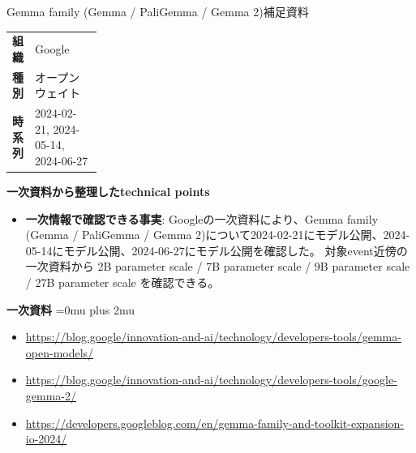 \Needspace{0.38\textheight}
\begin{technicalnote}{Gemma family (Gemma / PaliGemma / Gemma 2)}{補足資料}
\begingroup
\begin{tabularx}{\linewidth}{@{}>{\bfseries}p{0.22\linewidth}X@{}}
組織 & Google \\
種別 & オープンウェイト \\
時系列 & 2024-02-21, 2024-05-14, 2024-06-27 \\
\end{tabularx}
\smallskip
\begin{minipage}{\linewidth}
{\bfseries 一次資料から整理したtechnical points}
\begin{itemize}[leftmargin=1.5em,itemsep=0.35em]
\item \textbf{一次情報で確認できる事実}: Googleの一次資料により、Gemma family (Gemma / PaliGemma / Gemma 2)について2024-02-21にモデル公開、2024-05-14にモデル公開、2024-06-27にモデル公開を確認した。 対象event近傍の一次資料から 2B parameter scale / 7B parameter scale / 9B parameter scale / 27B parameter scale を確認できる。
\end{itemize}
\begin{minipage}{\linewidth}
\begin{samepage}
{\bfseries 一次資料}
\begingroup\sloppy
\Urlmuskip=0mu plus 2mu\relax
\begin{itemize}[leftmargin=1.5em,itemsep=0.25em]
\item {\scriptsize\url{https://blog.google/innovation-and-ai/technology/developers-tools/gemma-open-models/}}
\item {\scriptsize\url{https://blog.google/innovation-and-ai/technology/developers-tools/google-gemma-2/}}
\item {\scriptsize\url{https://developers.googleblog.com/en/gemma-family-and-toolkit-expansion-io-2024/}}
\end{itemize}
\endgroup
\end{samepage}
\end{minipage}
\end{minipage}
\endgroup
\end{technicalnote}
\medskip

